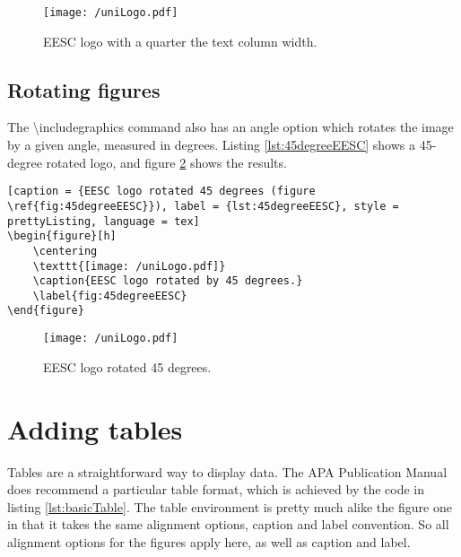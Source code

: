\begin{figure}[h]
	\centering
	\texttt{[image: /uniLogo.pdf]}
	\caption{EESC logo with a quarter the text column width.}
	\label{fig:quarterTextEESC}
\end{figure}

	\subsection{Rotating figures}

	The  {\ttfamily\small \textbackslash includegraphics} command also has an {\ttfamily angle} option which rotates the image by a given angle, measured in degrees. Listing \ref{lst:45degreeEESC} shows a 45-degree rotated logo, and figure \ref{fig:45degreeEESC} shows the results.

\begin{lstlisting}[caption = {EESC logo rotated 45 degrees (figure \ref{fig:45degreeEESC}}), label = {lst:45degreeEESC}, style = prettyListing, language = tex]
\begin{figure}[h]
	\centering
	\texttt{[image: /uniLogo.pdf]}
	\caption{EESC logo rotated by 45 degrees.}
	\label{fig:45degreeEESC}
\end{figure}
\end{lstlisting}

\begin{figure}[h]
	\centering
	\texttt{[image: /uniLogo.pdf]}
	\caption{EESC logo rotated 45 degrees.}
	\label{fig:45degreeEESC}
\end{figure}

	\section{Adding tables}

	Tables are a straightforward way to display data. The APA Publication Manual does recommend a particular table format, which is achieved by the code in listing \ref{lst:basicTable}. The {\ttfamily table} environment is pretty much alike the figure one in that it takes the same alignment options, caption and label convention. So all alignment options for the figures apply here, as well as caption and label.

